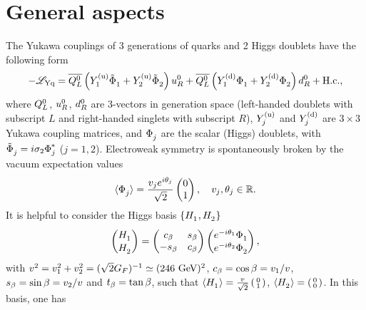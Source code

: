 \documentclass[12pt,a4paper]{article}
\begin{document}
\section{General aspects\label{SEC:Generalities}}
The Yukawa couplings of 3 generations of quarks and 2 Higgs doublets have the following form
\begin{equation}\label{eq:LYuk:00}
-\mathscr L_{\rm Yq}= \wQLb\left(\YU{1}\SDC{1}+\YU{2}\SDC{2}\right)\wUR+\wQLb\left(\YD{1}\SD{1}+\YD{2}\SD{2}\right)\wDR+\Hc,
\end{equation}
where $Q_L^0$, $u_R^0$, $d_R^0$ are 3-vectors in generation space (left-handed doublets with subscript $L$ and right-handed singlets with subscript $R$), $Y_{j}^{\rm (u)}$ and $Y_{j}^{\rm (d)}$ are $3\times 3$ Yukawa coupling matrices, and $\SD{j}$ are the scalar (Higgs) doublets, with $\SDC{j}=i\sigma_2\SDc{j}$ ($j=1,2$).
Electroweak symmetry is spontaneously broken by the vacuum expectation values
\begin{equation}\label{eq:vevs}
\VEV{\SD{j}}=\frac{\vev{j}e^{i\vevPh{j}}}{\sqrt 2}\begin{pmatrix}0\\ 1\end{pmatrix},\quad \vev{j},\vevPh{j}\in\mathbb{R}.
\end{equation}
It is helpful to consider the Higgs basis $\{\HSD{1},\HSD{2}\}$ \cite{Donoghue:1978cj,Georgi:1978ri,Botella:1994cs}
\begin{equation}
 \begin{pmatrix} \HSD{1} \\ \HSD{2}\end{pmatrix}=
 \begin{pmatrix} \Cb & \Sb\\ -\Sb & \Cb \end{pmatrix}
 \begin{pmatrix} e^{-i\vevPh{1}}\SD{1}\\ e^{-i\vevPh{2}}\SD{2}\end{pmatrix},
\end{equation}
with $v_{}^2=v_{1}^2+v_{2}^2=(\sqrt 2 G_F)^{-1}\simeq (246\ \text{GeV})^2$, $c_\beta=\cos\beta=v_{1}/v_{}$, $s_\beta=\sin\beta=v_{2}/v_{}$ and $t_\beta=\tan\beta$, such that $\VEV{\HSD{1}}=\frac{\vev{}}{\sqrt 2}\left(\begin{smallmatrix}0\\ 1\end{smallmatrix}\right)$, $\VEV{\HSD{2}}=\left(\begin{smallmatrix}0\\ 0\end{smallmatrix}\right)$. In this basis, one has
\end{document}
